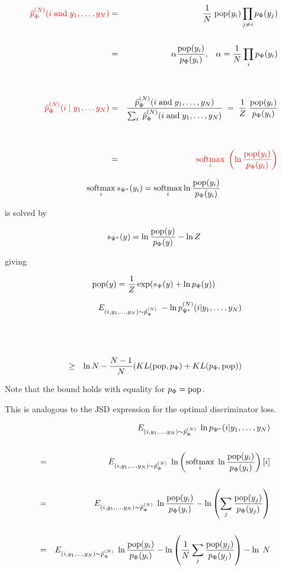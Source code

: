 {
{\huge
\begin{eqnarray*}
{\color{red} \tilde{p}_\Phi^{(N)}(i \;\mathrm{and}\;y_1,\ldots,y_{N})} & = & \frac{1}{N}\;\mathrm{pop}(y_i)\prod_{j \not = i}p_\Phi(y_j) \\
\\
& = & \alpha \frac{\mathrm{pop}(y_i)}{p_\Phi(y_i)},\;\;\;\alpha = \frac{1}{N} \prod_i p_\Phi(y_i) \\
\\
\\
{\color{red} \tilde{p}_\Phi^{(N)}(i\;|\;y_1,\ldots y_{N})} & = & \frac{\tilde{p}_\Phi^{(N)}(i\;\mbox{and} \; y_1,\ldots,y_{N})}{\sum_i \;\tilde{p}_\Phi^{(N)}(i \;\mbox{and}\; y_1,\ldots,y_{N})} \;=\;\frac{1}{Z} \;\frac{\mathrm{pop}(y_i)}{p_\Phi(y_i)} \\
\\
\\
& = & {\color{red} \operatorname*{softmax}_i\; \left(\ln \frac{\mathrm{pop}(y_i)}{p_\Phi(y_i)}\right)}
\end{eqnarray*}
}


$$\operatorname*{softmax}_i s_{\Psi^*}(y_i) =  \operatorname*{softmax}_i \ln \frac{\mathrm{pop}(y_i)}{p_\Phi(y_i)}$$

\vfill
is solved by

\vfill
$$s_{\Psi^*}(y) = \ln \frac{\mathrm{pop}(y)}{p_\Phi(y)} - \ln Z$$

\vfill
giving

$$\mathrm{pop}(y) = \frac{1}{Z} \exp(s_\Psi(y) + \ln p_\Phi(y))$$


\begin{eqnarray*}
  && E_{(i,y_1,\dots,y_{N}) \sim \tilde{p}_\Phi^{(N)}}\;- \ln p^{(N)}_{\Psi^*}(i|y_1,\ldots,y_{N}) \\
  \\
  \\
  \\
  & \geq & \ln N - \frac{N-1}{N}(KL(\mathrm{pop},p_\Phi) + KL(p_\Phi,\mathrm{pop}))
\end{eqnarray*}

\vfill
Note that the bound holds with equality for $p_\Phi = \mathrm{pop}$.

\vfill
This is analogous to the JSD expression for the optimal discriminator loss.

{\huge
 \begin{eqnarray*}
    & & E_{(i,y_1,\ldots,y_{N}) \sim \tilde{p}_\Phi^{(N)}}\;\ln p_{\Psi^*}(i|y_1,\ldots,y_{N}) \\
    \\
    & = & E_{(i,y_1,\ldots,y_{N}) \sim \tilde{p}_\Phi^{(N)}}\;\ln \left(\operatorname*{softmax}_i \;\ln \frac{\mathrm{pop}(y_i)}{p_\Phi(y_i)}\right)[i] \\
    \\
    & = & E_{(i,y_1,\ldots,y_{N}) \sim \tilde{p}_\Phi^{(N)}}\;\ln\frac{\mathrm{pop}(y_i)}{p_\Phi(y_i)} - \ln\left(\sum_j \frac{\mathrm{pop}(y_j)}{p_\Phi(y_j)} \right) \\
    \\
    & = & E_{(i,y_1,\ldots,y_{N}) \sim \tilde{p}_\Phi^{(N)}}\;\ln\frac{\mathrm{pop}(y_i)}{p_\Phi(y_i)} - \ln\left(\frac{1}{N}\sum_j \frac{\mathrm{pop}(y_j)}{p_\Phi(y_j)} \right) - \ln\;N
  \end{eqnarray*}
}

}
